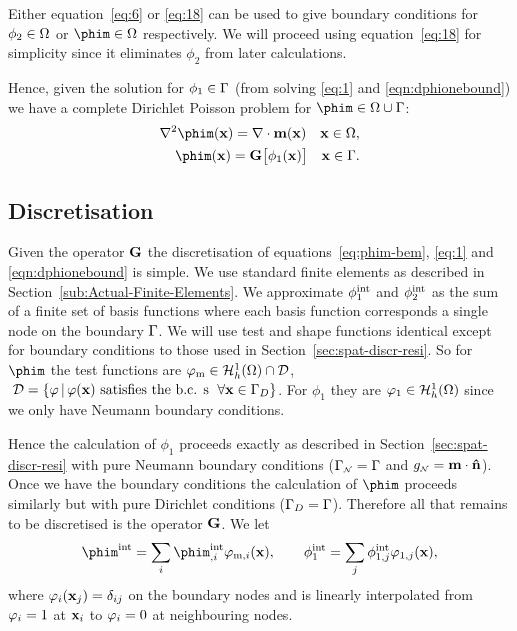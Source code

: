 Either equation~\eqref{eq:6} or \eqref{eq:18} can be used to give boundary conditions for $\phi_2 \in \Omega$ or $\phim \in \magd$ respectively. We will proceed using equation~\eqref{eq:18} for simplicity since it eliminates $\phi_2$ from later calculations.

 Hence, given the solution for $\phi_1 \in {\Gamma}$ (from solving \eqref{eq:1} and \eqref{eqn:dphionebound}) we have a complete Dirichlet Poisson problem for $\phim \in \magd \cup \boundd$:
\begin{align}
  \label{eq:phim-bem}
  \nabla^2 \phim(\xv) = \nabla \cdot \mv(\xv) \quad \xv \in \magd, \\
  \phim(\xv) = \bm \big[ \phi_1(\xv) \big] \quad \xv \in \boundd. 
\end{align}

\subsection{Discretisation}
\label{sec:discretisation}

Given the operator ${\mathbf{G}}$ the discretisation of equations~\eqref{eq:phim-bem}, \eqref{eq:1} and \eqref{eqn:dphionebound} is simple. We use standard finite elements as described in Section~\ref{sub:Actual-Finite-Elements}. We approximate $\phi^{\text{int}}_1$ and $\phi^{\text{int}}_2$ as the sum of a finite set of basis functions where each basis function corresponds a single node on the boundary ${\Gamma}$. We will use test and shape functions identical except for boundary conditions to those used in Section~\ref{sec:spat-discr-resi}. So for $\phim$ the test functions are $\varphi_{\text{m}} \in {\mathcal{H}^1_h(\Omega)} \cap \mathcal{D}$, $\;\mathcal{D} = \{ \varphi \,|\, \varphi(\mathbf{x}) \text{ satisfies the b.c. s } \; \forall \mathbf{x} \in {\Gamma}_D \}$. For $\phi_1$ they are $\varphi_1 \in {\mathcal{H}^1_h(\Omega)}$ since we only have Neumann boundary conditions.

Hence the calculation of $\phi_1$ proceeds exactly as described in Section~\ref{sec:spat-discr-resi} with pure Neumann boundary conditions (${\Gamma}_{\scriptscriptstyle{\mathcal{N}}} = {\Gamma}$ and $g_{\scriptscriptstyle{\mathcal{N}}} = \mathbf{m} \cdot \mathbf{\hat{n}}$). Once we have the boundary conditions the calculation of $\phim$ proceeds similarly but with pure Dirichlet conditions (${\Gamma}_D = {\Gamma}$). Therefore all that remains to be discretised is the operator ${\mathbf{G}}$. We let
\begin{equation}
  \phim^\inte = \sum_\ibasis \phim_{,\ibasis}^\inte \tbf_{\text{m},\ibasis}(\xv),
  \qquad
  \phi^\inte_1 = \sum_\ibasisb \phi^\inte_{1,\ibasisb} \tbf_{1,\ibasisb}(\xv),
  \label{eq:25}
\end{equation}
where $\varphi_{i}(\mathbf{x}_{j}) = \delta_{{i} {j}}$ on the boundary nodes and is linearly interpolated from $\varphi_{i} = 1$ at $\mathbf{x}_{i}$ to $\varphi_{i} = 0$ at neighbouring nodes.

